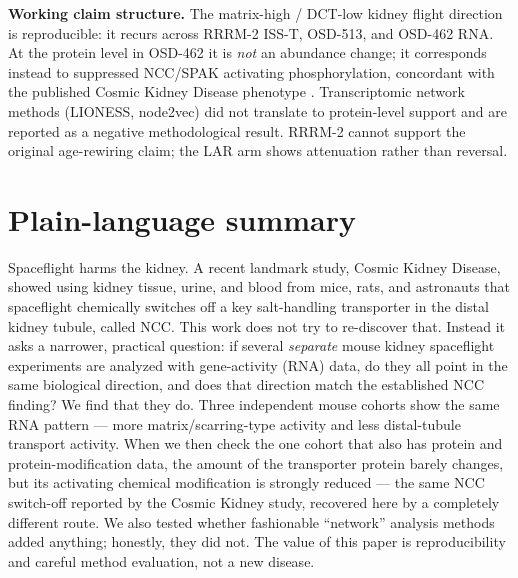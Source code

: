 \documentclass[11pt]{article}
\begin{document}
\vspace{0.8em}
\noindent\textbf{Working claim structure.}
The matrix-high / DCT-low kidney flight direction is reproducible: it recurs across RRRM-2 ISS-T, OSD-513, and OSD-462 RNA. At the protein level in OSD-462 it is \emph{not} an abundance change; it corresponds instead to suppressed NCC/SPAK activating phosphorylation, concordant with the published Cosmic Kidney Disease phenotype \citep{siew2024cosmic}. Transcriptomic network methods (LIONESS, node2vec) did not translate to protein-level support and are reported as a negative methodological result. RRRM-2 cannot support the original age-rewiring claim; the LAR arm shows attenuation rather than reversal.

\clearpage

\section*{Plain-language summary}

\noindent
Spaceflight harms the kidney. A recent landmark study, Cosmic Kidney Disease, showed using kidney tissue, urine, and blood from mice, rats, and astronauts that spaceflight chemically switches off a key salt-handling transporter in the distal kidney tubule, called NCC. This work does not try to re-discover that. Instead it asks a narrower, practical question: if several \emph{separate} mouse kidney spaceflight experiments are analyzed with gene-activity (RNA) data, do they all point in the same biological direction, and does that direction match the established NCC finding? We find that they do. Three independent mouse cohorts show the same RNA pattern --- more matrix/scarring-type activity and less distal-tubule transport activity. When we then check the one cohort that also has protein and protein-modification data, the amount of the transporter protein barely changes, but its activating chemical modification is strongly reduced --- the same NCC switch-off reported by the Cosmic Kidney study, recovered here by a completely different route. We also tested whether fashionable ``network'' analysis methods added anything; honestly, they did not. The value of this paper is reproducibility and careful method evaluation, not a new disease.

\vspace{0.8em}
\end{document}

